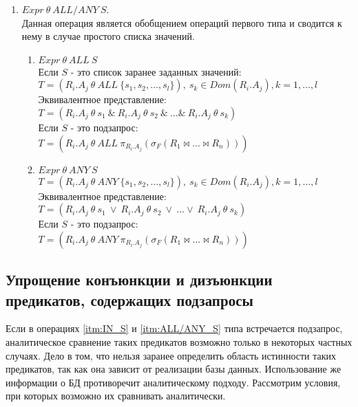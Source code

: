 \documentclass{cmi}
\def \n #1{\mathit{#1}}
\begin{document}
\begin{enumerate}
	
	\item \label{itm:ALL/ANY_S} $\n{Expr}\ \theta\ \n{ALL/ANY}\ S$.\\
	Данная операция является обобщением операций первого типа и сводится к нему в случае простого списка
	значений.
	\begin{enumerate}
		\item $\n{Expr}\ \theta\ \n{ALL}\ S$\\ Если $S$ - это список заранее заданных значений:\\
		$T = (\n{R_i.A_j}\ \theta\ \n{ALL}\ \{s_1, s_2, \dots, s_l \}),\ s_k \in Dom(R_i.A_j), k = 1,
		\dots, l$\\  
		Эквивалентное представление:\\
		$T = (\n{R_i.A_j}\ \theta\ s_1\ \&\ \n{R_i.A_j}\ \theta\ s_2\ \&\ \dots \&\ \n{R_i.A_j}\ \theta\
		s_k)$\\
		Если $S$ - это подзапрос:\\
		$T = (\n{R_i.A_j}\ \theta\ \n{ALL}\ \pi_{R_i.A_j} (\sigma_F (R_1 \Join \dots \Join R_n)))$\\
		\item $\n{Expr}\ \theta\ \n{ANY}\ S$\\
		$T = (\n{R_i.A_j}\ \theta\ \n{ANY}\ \{s_1, s_2, \dots, s_l \}),\ s_k \in Dom(R_i.A_j), k = 1,
		\dots, l$\\  
		Эквивалентное представление:\\
		$T = (\n{R_i.A_j}\ \theta\ s_1\ \vee\ \n{R_i.A_j}\ \theta\ s_2\ \vee\ \dots \vee\ \n{R_i.A_j}\
		\theta\ s_k)$\\
		Если $S$ - это подзапрос:\\
		$T = (\n{R_i.A_j}\ \theta\ \n{ANY}\ \pi_{R_i.A_j} (\sigma_F (R_1 \Join \dots \Join R_n)))$\\
	\end{enumerate}
\end{enumerate}

\subsection{Упрощение конъюнкции и дизъюнкции предикатов, содержащих подзапросы}
Если в операциях \ref{itm:IN_S} и \ref{itm:ALL/ANY_S} типа встречается подзапрос,
аналитическое сравнение таких предикатов возможно только в некоторых частных случаях. Дело в том,
что нельзя заранее определить область истинности таких предикатов, так как она зависит от реализации
базы данных. Использование же информации о БД противоречит аналитическому подходу. Рассмотрим
условия, при которых возможно их сравнивать аналитически.
\end{document}
